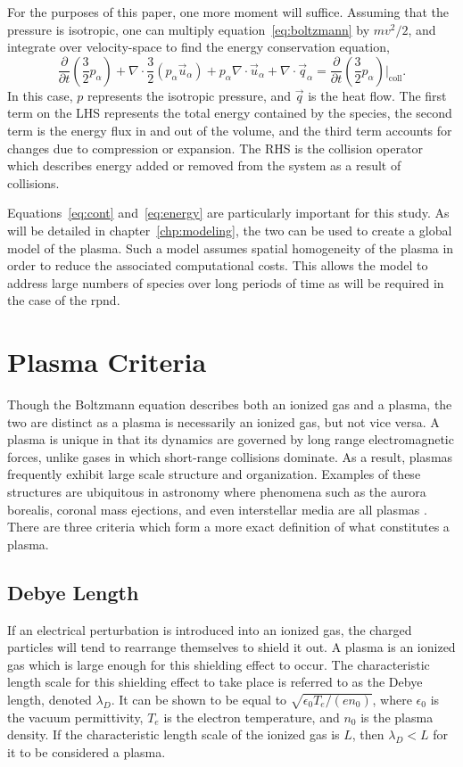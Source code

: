 For the purposes of this paper, one more moment will suffice. Assuming that the
pressure is isotropic, one can multiply equation~\ref{eq:boltzmann} by $mv^2/2$,
and integrate over velocity-space to find the energy conservation equation,
\begin{equation}
  \frac{\partial}{\partial t}\left(\frac{3}{2}p_\alpha\right) 
  + \nabla\cdot\frac{3}{2} (p_\alpha\vec{u}_\alpha)
  + p_\alpha\nabla\cdot\vec{u}_\alpha
  + \nabla\cdot\vec{q}_\alpha
  = \frac{\partial}{\partial
  t}\left(\frac{3}{2}p_\alpha\right)\bigg|_\mathrm{coll}.
  \label{eq:energy}
\end{equation}
In this case, $p$ represents the isotropic pressure, and $\vec{q}$ is the heat
flow. The first term on the LHS represents the total energy contained by the
species, the second term is the energy flux in and out of the volume, and the
third term accounts for changes due to compression or expansion. The RHS is the
collision operator which describes energy added or removed from the system as a
result of collisions.

Equations~\ref{eq:cont} and~\ref{eq:energy} are particularly important for this
study. As will be detailed in chapter~\ref{chp:modeling}, the two can be used to
create a global model of the plasma. Such a model assumes spatial homogeneity of
the plasma in order to reduce the associated computational costs. This allows
the model to address large numbers of species over long periods of time as will
be required in the case of the \acs{rpnd}.

\section{Plasma Criteria}
Though the Boltzmann equation describes both an ionized gas and a plasma, the
two are distinct as a plasma is necessarily an ionized gas, but not vice versa.
A plasma is unique in that its dynamics are governed by long range
electromagnetic forces, unlike gases in which short-range collisions dominate.
As a result, plasmas frequently exhibit large scale structure and organization.
Examples of these structures are ubiquitous in astronomy where phenomena such as
the aurora borealis, coronal mass ejections, and even interstellar media are all
plasmas \cite{Chen1984}. There are three criteria which form a more exact
definition of what constitutes a plasma.

\subsection{Debye Length}
If an electrical perturbation is introduced into an ionized gas, the charged
particles will tend to rearrange themselves to shield it out. A plasma is an
ionized gas which is large enough for this shielding effect to occur. The
characteristic length scale for this shielding effect to take place is referred
to as the Debye length, denoted $\lambda_D$. It can be shown to be equal to
$\sqrt{\epsilon_0T_e/(en_0)}$, where $\epsilon_0$ is the vacuum permittivity,
$T_e$ is the electron temperature, and $n_0$ is the plasma density. If the
characteristic length scale of the ionized gas is $L$, then $\lambda_D < L$ for
it to be considered a plasma.

